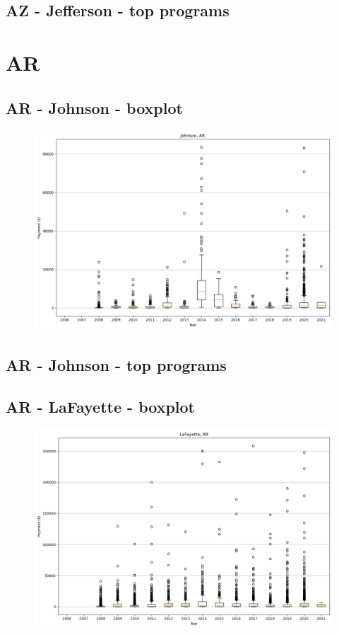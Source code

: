 \subsection*{AZ - Jefferson - top programs}

\newpage
\section*{AR}
\subsection*{AR - Johnson - boxplot}
\begin{figure}[h]
\centering
\includegraphics[width=7in]{../output/boxplots/counties/Johnson-AR_boxplot.png}
\end{figure}


\subsection*{AR - Johnson - top programs}

\newpage
\subsection*{AR - LaFayette - boxplot}
\begin{figure}[h]
\centering
\includegraphics[width=7in]{../output/boxplots/counties/LaFayette-AR_boxplot.png}
\end{figure}


